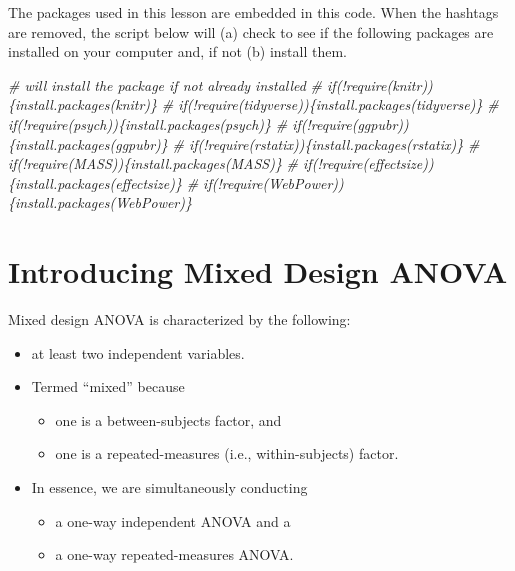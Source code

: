 \documentclass[
  11pt,
]{book}
\newenvironment{Shaded}{\begin{snugshade}}{\end{snugshade}}
\newcommand{\CommentTok}[1]{\textcolor[rgb]{0.56,0.35,0.01}{\textit{#1}}}
\providecommand{\tightlist}{%
  \setlength{\itemsep}{0pt}\setlength{\parskip}{0pt}}
\begin{document}
The packages used in this lesson are embedded in this code. When the hashtags are removed, the script below will (a) check to see if the following packages are installed on your computer and, if not (b) install them.

\begin{Shaded}
\begin{Highlighting}[]
\CommentTok{\# will install the package if not already installed}
\CommentTok{\# if(!require(knitr))\{install.packages(\textquotesingle{}knitr\textquotesingle{})\}}
\CommentTok{\# if(!require(tidyverse))\{install.packages(\textquotesingle{}tidyverse\textquotesingle{})\}}
\CommentTok{\# if(!require(psych))\{install.packages(\textquotesingle{}psych\textquotesingle{})\}}
\CommentTok{\# if(!require(ggpubr))\{install.packages(\textquotesingle{}ggpubr\textquotesingle{})\}}
\CommentTok{\# if(!require(rstatix))\{install.packages(\textquotesingle{}rstatix\textquotesingle{})\}}
\CommentTok{\# if(!require(MASS))\{install.packages(\textquotesingle{}MASS\textquotesingle{})\}}
\CommentTok{\# if(!require(effectsize))\{install.packages(\textquotesingle{}effectsize\textquotesingle{})\}}
\CommentTok{\# if(!require(WebPower))\{install.packages(\textquotesingle{}WebPower\textquotesingle{})\}}
\end{Highlighting}
\end{Shaded}

\hypertarget{introducing-mixed-design-anova}{%
\section{Introducing Mixed Design ANOVA}\label{introducing-mixed-design-anova}}

Mixed design ANOVA is characterized by the following:

\begin{itemize}
\tightlist
\item
  at least two independent variables.
\item
  Termed ``mixed'' because

  \begin{itemize}
  \tightlist
  \item
    one is a between-subjects factor, and
  \item
    one is a repeated-measures (i.e., within-subjects) factor.
  \end{itemize}
\item
  In essence, we are simultaneously conducting

  \begin{itemize}
  \tightlist
  \item
    a one-way independent ANOVA and a
  \item
    a one-way repeated-measures ANOVA.
  \end{itemize}
\end{itemize}
\end{document}
